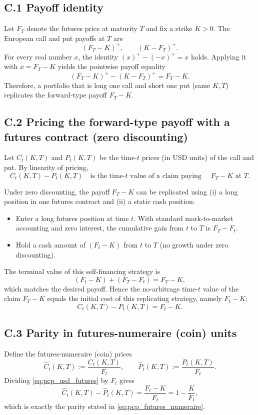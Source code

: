 \documentclass[a4paper,titlepage,12pt]{report}
\theoremstyle{plain}
\begin{document}
\subsection*{C.1 Payoff identity}
Let $F_T$ denote the futures price at maturity $T$ and fix a strike $K>0$. The European call and put
payoffs at $T$ are
\[
(F_T-K)^+,
\qquad
(K-F_T)^+.
\]
For every real number $x$, the identity $(x)^+ - (-x)^+ = x$ holds. Applying it with $x=F_T-K$
yields the pointwise payoff equality
\begin{equation}
(F_T-K)^+ - (K-F_T)^+ = F_T - K.
\label{eq:pcp_payoff_identity}
\end{equation}
Therefore, a portfolio that is long one call and short one put (same $K,T$) replicates the forward-type
payoff $F_T-K$.

\subsection*{C.2 Pricing the forward-type payoff with a futures contract (zero discounting)}
Let $C_t(K,T)$ and $P_t(K,T)$ be the time-$t$ prices (in USD units) of the call and put. By
linearity of pricing,
\begin{equation}
C_t(K,T) - P_t(K,T)
\quad \text{is the time-$t$ value of a claim paying } \quad F_T-K \text{ at } T.
\label{eq:pcp_value_forward_claim}
\end{equation}

Under zero discounting, the payoff $F_T-K$ can be replicated using (i) a long position in one
futures contract and (ii) a static cash position:
\begin{itemize}
\item Enter a long futures position at time $t$. With standard mark-to-market accounting and zero
interest, the cumulative gain from $t$ to $T$ is $F_T - F_t$.
\item Hold a cash amount of $(F_t-K)$ from $t$ to $T$ (no growth under zero discounting).
\end{itemize}
The terminal value of this self-financing strategy is
\[
(F_t-K) + (F_T-F_t) = F_T - K,
\]
which matches the desired payoff. Hence the no-arbitrage time-$t$ value of the claim $F_T-K$ equals
the initial cost of this replicating strategy, namely $F_t-K$:
\begin{equation}
C_t(K,T) - P_t(K,T) = F_t - K.
\label{eq:pcp_usd_futures}
\end{equation}

\subsection*{C.3 Parity in futures-numeraire (coin) units}
Define the futures-numeraire (coin) prices
\[
\widehat C_t(K,T) := \frac{C_t(K,T)}{F_t},
\qquad
\widehat P_t(K,T) := \frac{P_t(K,T)}{F_t}.
\]
Dividing \eqref{eq:pcp_usd_futures} by $F_t$ gives
\begin{equation}
\boxed{
\widehat C_t(K,T) - \widehat P_t(K,T)
=
\frac{F_t-K}{F_t}
=
1-\frac{K}{F_t},}
\label{eq:pcp_futures_numeraire_proved}
\end{equation}
which is exactly the parity stated in \eqref{eq:pcp_futures_numeraire}.
\end{document}
